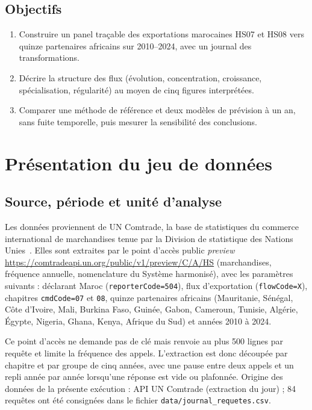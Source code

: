 \documentclass[11pt,a4paper]{article}
\begin{document}
\subsection{Objectifs}
\begin{enumerate}
\item Construire un panel traçable des exportations marocaines HS07 et HS08 vers quinze partenaires africains sur 2010--2024, avec un journal des transformations.
\item Décrire la structure des flux (évolution, concentration, croissance, spécialisation, régularité) au moyen de cinq figures interprétées.
\item Comparer une méthode de référence et deux modèles de prévision à un an, sans fuite temporelle, puis mesurer la sensibilité des conclusions.
\end{enumerate}

\section{Présentation du jeu de données}\label{sec:data}
\subsection{Source, période et unité d'analyse}
Les données proviennent de UN Comtrade, la base de statistiques du commerce international de marchandises tenue par la Division de statistique des Nations Unies~\cite{comtrade}. Elles sont extraites par le point d'accès public \emph{preview} \url{https://comtradeapi.un.org/public/v1/preview/C/A/HS} (marchandises, fréquence annuelle, nomenclature du Système harmonisé), avec les paramètres suivants : déclarant Maroc (\texttt{reporterCode=504}), flux d'exportation (\texttt{flowCode=X}), chapitres \texttt{cmdCode=07} et \texttt{08}, quinze partenaires africains (Mauritanie, Sénégal, Côte d'Ivoire, Mali, Burkina Faso, Guinée, Gabon, Cameroun, Tunisie, Algérie, Égypte, Nigeria, Ghana, Kenya, Afrique du Sud) et années 2010 à 2024.

Ce point d'accès ne demande pas de clé mais renvoie au plus 500 lignes par requête et limite la fréquence des appels. L'extraction est donc découpée par chapitre et par groupe de cinq années, avec une pause entre deux appels et un repli année par année lorsqu'une réponse est vide ou plafonnée. Origine des données de la présente exécution : API UN Comtrade (extraction du jour) ; 84 requêtes ont été consignées dans le fichier \texttt{data/journal\_requetes.csv}.
\end{document}
